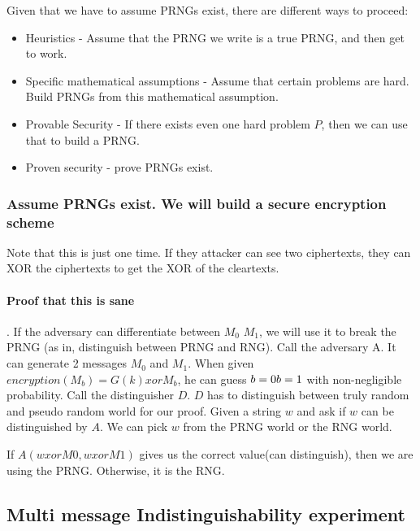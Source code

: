 Given that we have to assume PRNGs exist, there are different ways to proceed:
\begin{itemize}
\item Heuristics - Assume that the PRNG we write is a true PRNG, and then get to work.
\item Specific mathematical assumptions - Assume that certain problems are hard. Build PRNGs from this mathematical assumption.
\item Provable Security - If there exists even one hard problem $P$, then we can use that to build a PRNG.
\item Proven security - prove PRNGs exist.
\end{itemize}


\subsubsection{Assume PRNGs exist. We will build a secure encryption scheme}



Note that this is just one time. If they attacker can see two ciphertexts, they can XOR the ciphertexts to get the XOR of the cleartexts.

\paragraph{Proof that this is sane}.
If the adversary can differentiate between $M_0$ $M_1$, we will use it to break the PRNG (as in, distinguish between PRNG and RNG).
Call the adversary A. It can generate 2 messages $M_0$ and $M_1$. When given $encryption(M_b) = G(k) xor M_b$, he can guess $b = 0 \/ b = 1$ with non-negligible probability.
Call the distinguisher $D$. $D$ has to distinguish between truly random and pseudo random world for our proof.
Given a string $w$ and ask if $w$ can be distinguished by $A$. We can pick $w$ from the PRNG world or the RNG world.

If $A(w xor M0, w xor M1)$ gives us the  correct value(can distinguish), then we are using the PRNG. Otherwise, it is the RNG.


\subsection{Multi message Indistinguishability experiment}

